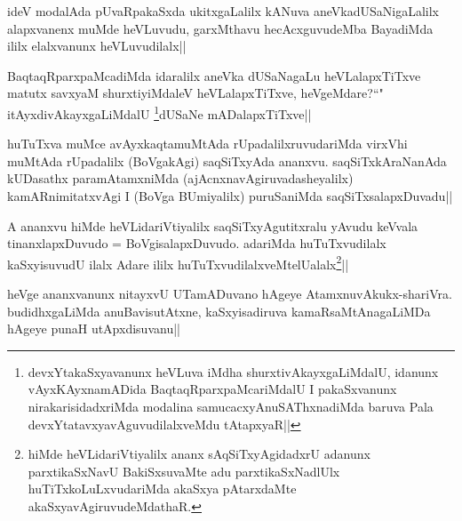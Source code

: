 \begin{artha}
ideV modalAda pUvaRpakaSxda ukitxgaLalilx kANuva aneVkadUSaNigaLalilx alapxvanenx muMde heVLuvudu, garxMthavu hecAcxguvudeMba BayadiMda ililx elalxvanunx heVLuvudilalx||
\end{artha}


\begin{artha}
BaqtaqRparxpaMcadiMda idaralilx aneVka dUSaNagaLu heVLalapxTiTxve matutx savxyaM 
shurxtiyiMdaleV heVLalapxTiTxve, heVgeMdare?``\stext" itAyxdivAkayxgaLiMdalU
\footnote{devxYtakaSxyavanunx heVLuva iMdha shurxtivAkayxgaLiMdalU, idanunx vAyxKAyxnamADida BaqtaqRparxpaMcariMdalU I pakaSxvanunx nirakarisidadxriMda modalina samucacxyAnuSAThxnadiMda baruva Pala  devxYtatavxyavAguvudilalxveMdu tAtapxyaR||}dUSaNe 
mADalapxTiTxve||
\end{artha}


\begin{artha}
huTuTxva muMce avAyxkaqtamuMtAda rUpadalilxruvudariMda virxVhi muMtAda rUpadalilx (BoVgakAgi) saqSiTxyAda ananxvu. saqSiTxkAraNanAda kUDasathx paramAtamxniMda (ajAcnxnavAgiruvadasheyalilx) kamARnimitatxvAgi I (BoVga BUmiyalilx) puruSaniMda saqSiTxsalapxDuvadu||
\end{artha}


\begin{artha}
A ananxvu hiMde heVLidariVtiyalilx saqSiTxyAgutitxralu yAvudu keVvala tinanxlapxDuvudo = BoVgisalapxDuvudo. adariMda huTuTxvudilalx kaSxyisuvudU ilalx Adare ililx huTuTxvudilalxveMtelUalalx\footnote{hiMde heVLidariVtiyalilx ananx sAqSiTxyAgidadxrU adanunx parxtikaSxNavU BakiSxsuvaMte adu parxtikaSxNadlUlx huTiTxkoLuLxvudariMda akaSxya pAtarxdaMte akaSxyavAgiruvudeMdathaR.}||
\end{artha}


\begin{artha}
heVge ananxvanunx nitayxvU UTamADuvano hAgeye AtamxnuvAkukx-shariVra. budidhxgaLiMda 
anuBavisutAtxne, kaSxyisadiruva kamaRsaMtAnagaLiMDa hAgeye punaH utApxdisuvanu||
\end{artha}


